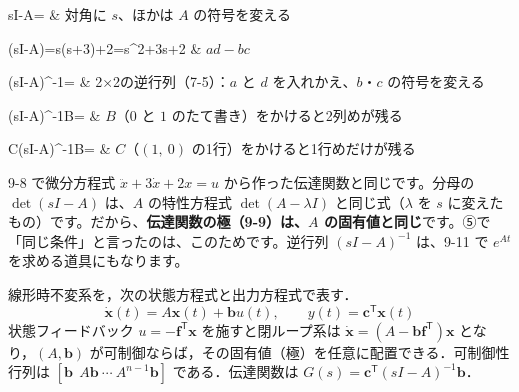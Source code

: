 \begin{bkhenkei}[0.6]
sI-A= & 対角に $s$、ほかは $A$ の符号を変える \\
\end{bkhenkei}
\begin{bkhenkei}[0.6]
\det(sI-A)=s(s+3)+2=s^2+3s+2 & $ad-bc$ \\
\end{bkhenkei}
\begin{bkhenkei}[0.6]
(sI-A)^{-1}= & 2×2の逆行列（7-5）：$a$ と $d$ を入れかえ、$b$・$c$ の符号を変える \\
\end{bkhenkei}
\begin{bkhenkei}[0.6]
(sI-A)^{-1}B= & $B$（$0$ と $1$ のたて書き）をかけると2列めが残る \\
\end{bkhenkei}
\begin{bkhenkei}[0.6]
C(sI-A)^{-1}B= & $C$（$(1,\ 0)$ の1行）をかけると1行めだけが残る \\
\end{bkhenkei}
9-8 で微分方程式 $\ddot x+3\dot x+2x=u$ から作った伝達関数と同じです。分母の $\det(sI-A)$ は、$A$ の特性方程式 $\det(A-\lambda I)$ と同じ式（$\lambda$ を $s$ に変えたもの）です。だから、\textbf{伝達関数の極（9-9）は、$A$ の固有値と同じ}です。⑤で「同じ条件」と言ったのは、このためです。逆行列 $(sI-A)^{-1}$ は、9-11 で $e^{At}$ を求める道具にもなります。



\begin{senmonsho}[制御工学の本ふうの書き方]
\begin{bkhonbun}
線形時不変系を，次の状態方程式と出力方程式で表す．
\[ \dot{\symbf{x}}(t)=A\symbf{x}(t)+\symbf{b}u(t),\qquad y(t)=\symbf{c}^{\mathsf T}\symbf{x}(t) \]
状態フィードバック $u=-\symbf{f}^{\mathsf T}\symbf{x}$ を施すと閉ループ系は $\dot{\symbf{x}}=(A-\symbf{b}\symbf{f}^{\mathsf T})\symbf{x}$ となり，$(A,\symbf{b})$ が可制御ならば，その固有値（極）を任意に配置できる．可制御性行列は $[\symbf{b}\ \ A\symbf{b}\ \cdots\ A^{n-1}\symbf{b}]$ である．伝達関数は $G(s)=\symbf{c}^{\mathsf T}(sI-A)^{-1}\symbf{b}$．
\end{bkhonbun}
\end{senmonsho}

